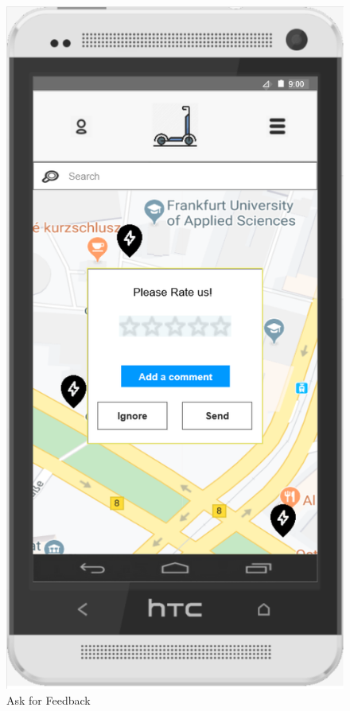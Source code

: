 \documentclass[a4paper, 12pt]{article}
\begin{document}
\begin{figure} [htbp]
  \begin{center}
    \includegraphics[scale=0.75]{images/prototypes/03-ask-for-feedback.png}
  \end{center}
  \caption{Ask for Feedback}
\end{figure}
\end{document}
